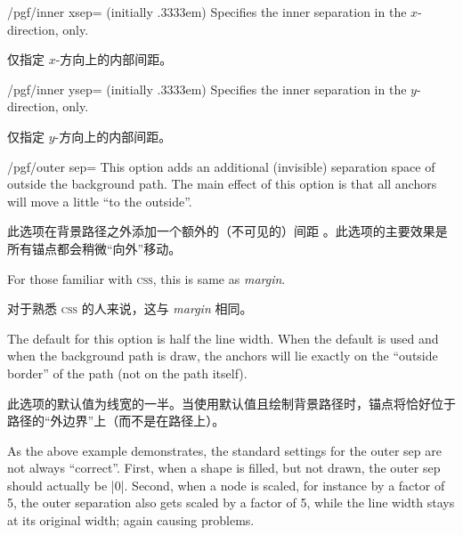 \begin{key}{/pgf/inner xsep= (initially .3333em)}
    Specifies the inner separation in the $x$-direction, only.

    仅指定 $x$-方向上的内部间距。
\end{key}

\begin{key}{/pgf/inner ysep= (initially .3333em)}
    Specifies the inner separation in the $y$-direction, only.

    仅指定 $y$-方向上的内部间距。
\end{key}

\begin{key}{/pgf/outer sep=}
    This option adds an additional (invisible) separation space of
     outside the background path. The main effect of this
    option is that all anchors will move a little ``to the outside''.

    此选项在背景路径之外添加一个额外的（不可见的）间距 。此选项的主要效果是所有锚点都会稍微“向外”移动。

    For those familiar with \textsc{css}, this is same as \emph{margin}.

    对于熟悉 \textsc{css} 的人来说，这与 \emph{margin} 相同。

    The default for this option is half the line width. When the default is
    used and when the background path is draw, the anchors will lie exactly on
    the ``outside border'' of the path (not on the path itself).
    
    此选项的默认值为线宽的一半。当使用默认值且绘制背景路径时，锚点将恰好位于路径的“外边界”上（而不是在路径上）。

\begin{codeexample}[]
\end{codeexample}

    As the above example demonstrates, the standard settings for the outer sep
    are not always ``correct''. First, when a shape is filled, but not drawn,
    the outer sep should actually be |0|. Second, when a node is scaled, for
    instance by a factor of 5, the outer separation also gets scaled by a
    factor of 5, while the line width stays at its original width; again
    causing problems.


\end{key}
